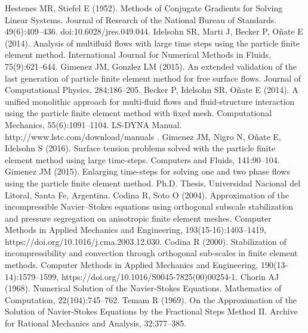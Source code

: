  Hestenes MR, Stiefel E (1952). Methods of Conjugate Gradients for Solving Linear Systems. Journal of Research of the National Bureau of Standards. 49(6):409--436. doi:10.6028/jres.049.044.
 Idelsohn SR, Marti J, Becker P, O\~nate E (2014). Analysis of multifluid flows with large time steps using the particle finite element method. International Journal for Numerical Methods in Fluids, 75(9):621--644.
 Gimenez JM, Gonzlez LM (2015). An extended validation of the last generation of particle finite element method for free surface flows. Journal of Computational Physics, 284:186--205.
 Becker P, Idelsohn SR, O\~nate E (2014). A unified monolithic approach for multi-fluid flows and fluid-structure interaction using the particle finite element method with fixed mesh. Computational Mechanics, 55(6):1091--1104.
 LS-DYNA Manual.\\
http://www.lstc.com/download/manuals .
 Gimenez JM, Nigro N, O\~nate E, Idelsohn S (2016). Surface tension problems solved with the particle finite element method using large time-steps. Computers and Fluids, 141:90--104.
 Gimenez JM (2015). Enlarging time-steps for solving one and two phase flows using the particle finite element method. Ph.D. Thesis, Universidad Nacional del Litoral, Santa Fe, Argentina.
 Codina R, Soto O (2004). Approximation of the incompressible Navier–Stokes equations using orthogonal subscale stabilization and pressure segregation on anisotropic finite element meshes. Computer Methods in Applied Mechanics and Engineering, 193(15-16):1403--1419, https://doi.org/10.1016/j.cma.2003.12.030.
 Codina R (2000). Stabilization of incompressibility and convection through orthogonal sub-scales in finite element methods. Computer Methods in Applied Mechanics and Engineering, 190(13-14):1579--1599, https://doi.org/10.1016/S0045-7825(00)00254-1.
 Chorin AJ (1968). Numerical Solution of the Navier-Stokes Equations. Mathematics of Computation, 22(104):745--762.
 Temam R (1969). On the Approximation of the Solution of Navier-Stokes Equations by the Fractional Steps Method II. Archive for Rational Mechanics and Analysis, 32:377--385.
